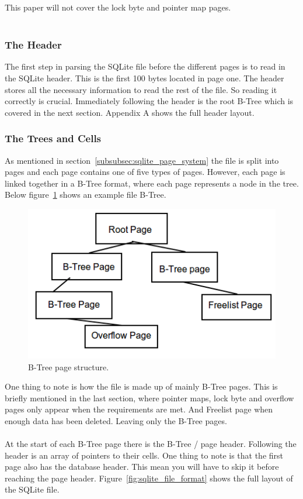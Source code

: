 This paper will not cover the lock byte and pointer map pages. 
\\\\
\subsubsection{The Header}
\label{subsubsec:sqlite_page_hader}

The first step in parsing the SQLite file before the different pages is to read in the SQLite header. This is the first 100 bytes located in page one. The header stores all the necessary information to read the rest of the file. So reading it correctly is crucial. Immediately following the header is the root B-Tree which is covered in the next section. Appendix A shows the full header layout.
\\
\subsubsection{The Trees and Cells}
\label{subsubsec:sqlite_trees_and_cells}

As mentioned in section~\ref{subsubsec:sqlite_page_system} the file is split into pages and each page contains one of five types of pages. However, each page is linked together in a B-Tree format, where each page represents a node in the tree. Below figure~\ref{fig:sqlite_btree_figure} shows an example file B-Tree.

\begin{figure}[H]
	\centering
	\includegraphics[scale=0.5]{images/sqlite_btree_format.png}
	\caption{B-Tree page structure.}
	\label{fig:sqlite_btree_figure}
\end{figure}

One thing to note is how the file is made up of mainly B-Tree pages. This is briefly mentioned in the last section, where pointer maps, lock byte and overflow pages only appear when the requirements are met. And Freelist page when enough data has been deleted. Leaving only the B-Tree pages.
\\\\
At the start of each B-Tree page there is the B-Tree / page header. Following the header is an array of pointers to their cells. One thing to note is that the first page also has the database header. This mean you will have to skip it before reaching the page header. Figure~\ref{fig:sqlite_file_format} shows the full layout of the SQLite file.

